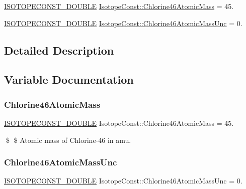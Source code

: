 \begin{DoxyCompactItemize}
\item 
\mbox{\hyperlink{group___isotope_const-_macros_ga8f45a7272ce02c0b4c65c44636ed719a}{I\+S\+O\+T\+O\+P\+E\+C\+O\+N\+S\+T\+\_\+\+D\+O\+U\+B\+LE}} \mbox{\hyperlink{group___isotope_const-_chlorine-_cl46_ga01a32c7a90ec3f729b50e8c7abeca285}{Isotope\+Const\+::\+Chlorine46\+Atomic\+Mass}} = 45.
\item 
\mbox{\hyperlink{group___isotope_const-_macros_ga8f45a7272ce02c0b4c65c44636ed719a}{I\+S\+O\+T\+O\+P\+E\+C\+O\+N\+S\+T\+\_\+\+D\+O\+U\+B\+LE}} \mbox{\hyperlink{group___isotope_const-_chlorine-_cl46_gab51c5d45d43a847bc4c0bd1b26507f34}{Isotope\+Const\+::\+Chlorine46\+Atomic\+Mass\+Unc}} = 0.
\end{DoxyCompactItemize}


\subsection{Detailed Description}


\subsection{Variable Documentation}
\mbox{\label{group___isotope_const-_chlorine-_cl46_ga01a32c7a90ec3f729b50e8c7abeca285}} 
\subsubsection{\texorpdfstring{Chlorine46\+Atomic\+Mass}{Chlorine46AtomicMass}}
{\footnotesize\ttfamily \mbox{\hyperlink{group___isotope_const-_macros_ga8f45a7272ce02c0b4c65c44636ed719a}{I\+S\+O\+T\+O\+P\+E\+C\+O\+N\+S\+T\+\_\+\+D\+O\+U\+B\+LE}} Isotope\+Const\+::\+Chlorine46\+Atomic\+Mass = 45.}

\$ \$ Atomic mass of Chlorine-\/46 in amu. \mbox{\label{group___isotope_const-_chlorine-_cl46_gab51c5d45d43a847bc4c0bd1b26507f34}} 
\subsubsection{\texorpdfstring{Chlorine46\+Atomic\+Mass\+Unc}{Chlorine46AtomicMassUnc}}
{\footnotesize\ttfamily \mbox{\hyperlink{group___isotope_const-_macros_ga8f45a7272ce02c0b4c65c44636ed719a}{I\+S\+O\+T\+O\+P\+E\+C\+O\+N\+S\+T\+\_\+\+D\+O\+U\+B\+LE}} Isotope\+Const\+::\+Chlorine46\+Atomic\+Mass\+Unc = 0.}


